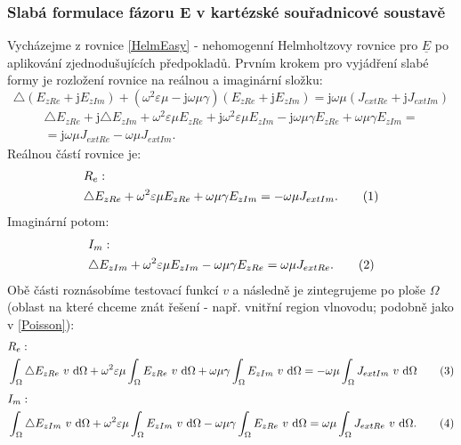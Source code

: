 \documentclass[12pt,a4paper,oneside]{article}
\numberwithin{equation}{section} %
\numberwithin{figure}{section} %
\numberwithin{table}{section} %
\newcommand{\mj}{\mathrm{j}} %
\newcommand{\faz}[1]{{\underline{#1}}} %
\newcommand\numberthis{\addtocounter{equation}{1}\tag{\theequation}}
\begin{document}
\subsubsection{Slabá formulace fázoru E v kartézské souřadnicové soustavě}

Vycházejme z rovnice \ref{HelmEasy} - nehomogenní Helmholtzovy rovnice pro $\faz{E}$ po aplikování zjednodušujících předpokladů. Prvním krokem pro vyjádření slabé formy je rozložení rovnice na reálnou a imaginární složku:
\begin{equation}
\triangle (E _{zRe} + \mj E _{zIm}) + (\omega ^2 \varepsilon \mu - \mj \omega \mu \gamma) (E _{zRe} + \mj E _{zIm}) = \mj \omega \mu (J _{extRe} + \mj J _{extIm})
\end{equation}
\begin{equation}
\begin{split}
\triangle E _{zRe} + \mj \triangle E _{zIm} + \omega ^2 \varepsilon \mu E_ {zRe} + \mj \omega ^2 \varepsilon \mu E _{zIm} - \mj \omega \mu \gamma E _{zRe} + \omega \mu \gamma E _{zIm} =\\
=\mj \omega \mu J _{extRe} - \omega \mu J _{extIm} .
\end{split}
\end{equation}
Reálnou částí rovnice je:
\begin{align*}
&R_{e}:
\\
&\triangle E_ {zRe} + \omega ^2 \varepsilon \mu E_ {zRe} + \omega \mu \gamma E _{zIm} = - \omega \mu J _{extIm} .
\numberthis
\end{align*}
Imaginární potom:
\begin{align*}
&I_{m}:
\\
&\triangle E _{zIm} + \omega ^2 \varepsilon \mu E _{zIm} - \omega \mu \gamma E _{zRe} = \omega \mu J _{extRe} .
\numberthis
\end{align*}
Obě části roznásobíme testovací funkcí $v$ a následně je  zintegrujeme po ploše $\Omega$ (oblast na které chceme znát řešení - např. vnitřní region vlnovodu; podobně jako v \ref{Poisson}):
\begin{align*}
&R_e:
\\
&\int _{\Omega} \triangle E _{zRe} ~ v ~ \ud \Omega + \omega ^2 \varepsilon \mu \int _{\Omega} E _{zRe} ~ v ~ \ud \Omega + \omega \mu \gamma \int _{\Omega} E _{zIm} ~ v ~ \ud \Omega = - \omega \mu \int _{\Omega} J _{extIm} ~ v ~ \ud \Omega
\numberthis
\end{align*}
\begin{align*}
&I_m:
\\
&\int _{\Omega} \triangle E _{zIm} ~ v ~ \ud \Omega + \omega ^2 \varepsilon \mu \int _{\Omega} E _{zIm} ~ v ~ \ud \Omega - \omega \mu \gamma \int _{\Omega} E _{zRe} ~ v ~ \ud \Omega = \omega \mu \int _{\Omega} J _{extRe} ~ v ~ \ud \Omega .
\numberthis
\end{align*}
\end{document}

